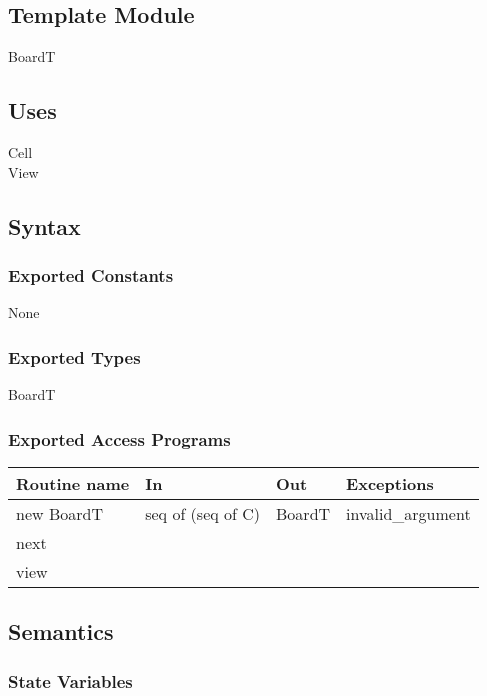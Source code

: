 \documentclass[12pt]{article}
\begin{document}
\subsection*{Template Module}

BoardT

\subsection* {Uses}

\noindent Cell\\
\noindent View

\subsection* {Syntax}

\subsubsection* {Exported Constants}

None

\subsubsection* {Exported Types}

BoardT

\subsubsection* {Exported Access Programs}

\begin{tabular}{| l | l | l | l |}
\hline
\textbf{Routine name} & \textbf{In} & \textbf{Out} & \textbf{Exceptions}\\
\hline
new BoardT  & seq of (seq of C) & BoardT & invalid\_argument\\
\hline
next & & &\\
\hline
view & & &\\
\hline

\hline
\end{tabular}

\subsection* {Semantics}

\subsubsection* {State Variables}
\end{document}
